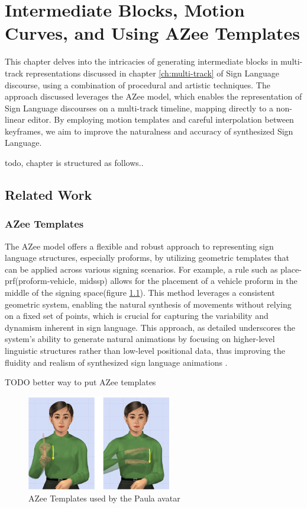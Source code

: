 \documentclass[../../main.tex]{subfiles}
\begin{document}
\chapter{Intermediate Blocks, Motion Curves, and Using AZee Templates}
\label{ch:intermediate_blocks}

This chapter delves into the intricacies of generating intermediate blocks in multi-track representations discussed in chapter \ref{ch:multi-track} of Sign Language discourse, using a combination of procedural and artistic techniques. The approach discussed leverages the AZee model, which enables the representation of Sign Language discourses on a multi-track timeline, mapping directly to a non-linear editor. By employing motion templates and careful interpolation between keyframes, we aim to improve the naturalness and accuracy of synthesized Sign Language.


todo, chapter is structured as follows.. 

\section{Related Work}
\label{sec:related_work}

\subsection{AZee Templates}
\label{subsec:azee_templates}

The AZee model offers a flexible and robust approach to representing sign language structures, especially proforms, by utilizing geometric templates that can be applied across various signing scenarios. For example, a rule such as place-prf(proform-vehicle, midssp) allows for the placement of a vehicle proform in the middle of the signing space(figure \ref{fig:azee_template_example}). This method leverages a consistent geometric system, enabling the natural synthesis of movements without relying on a fixed set of points, which is crucial for capturing the variability and dynamism inherent in sign language. This approach, as detailed underscores the system's ability to generate natural animations by focusing on higher-level linguistic structures rather than low-level positional data, thus improving the fluidity and realism of synthesized sign language animations \cite{filhol2018extending}.

TODO better way to put AZee templates

\begin{figure}
    \centering \includegraphics[width = 2.5in]{chapters/intermediate_blocks/images/azee_template_example.png}
    \caption{AZee Templates used by the Paula avatar}
    \label{fig:azee_template_example}
\end{figure}
\end{document}
